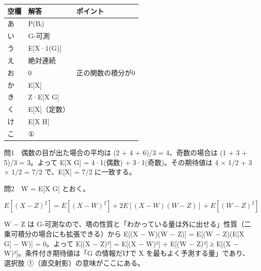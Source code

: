 \documentclass[
  10pt,
  a4paper,
]{article}
\begin{document}
\begin{longtable}[]{@{}lll@{}}
\toprule\noalign{}
空欄 & 解答 & ポイント \\
\midrule\noalign{}
\endhead
\bottomrule\noalign{}
\endlastfoot
あ & P(B{\fallbackfont ᵢ}) & \\
い & G-可測 & \\
う & E{[}X·1(G){]} & \\
え & 絶対連続 & \\
お & 0 & 正の関数の積分が0 \\
か & E{[}X{]} & \\
き & Z·E{[}X \textbar{} G{]} & \\
く & E{[}X{]}（定数） & \\
け & E{[}X \textbar{} H{]} & \\
こ & ① & \\
\end{longtable}

問1　偶数の目が出た場合の平均は (2 + 4 + 6)/3 = 4、奇数の場合は (1 + 3 +
5)/3 = 3。よって E{[}X \textbar{} G{]} = 4·1(偶数) +
3·1(奇数)。その期待値は 4 × 1/2 + 3 × 1/2 = 7/2 で、E{[}X{]} = 7/2
に一致する。

問2　W = E{[}X \textbar{} G{]} とおく。

\[E[(X - Z)^2] = E[(X - W)^2] + 2E[(X - W)(W - Z)] + E[(W - Z)^2]\]

W − Z は
G-可測なので、塔の性質と「わかっている量は外に出せる」性質（二乗可積分の場合にも拡張できる）から
E{[}(X − W)(W − Z){]} = E{[}(W − Z)(E{[}X \textbar{} G{]} − W){]} =
0。よって E{[}(X − Z)²{]} = E{[}(X − W)²{]} + E{[}(W − Z)²{]} ≥ E{[}(X −
W)²{]}。条件付き期待値は「G の情報だけで X
を最もよく予測する量」であり、選択肢 ①（直交射影）の意味がここにある。
\end{document}
